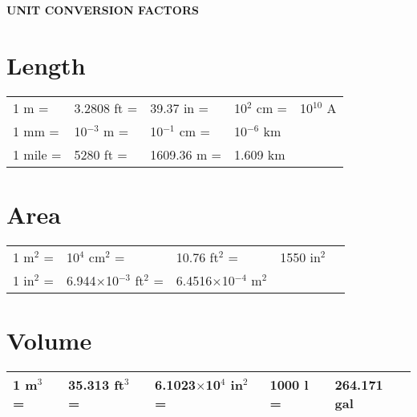 \documentclass[11pts,a4paper,amsmath,amssymb,floatfix]{article}
\begin{document}
\begin{center}
 {\bf UNIT CONVERSION FACTORS}
\end{center}

\section{Length}\label{Chapter:UnitConversion:Section:Length}
     \begin{center}
     \begin{tabular}{|l l l l l|}
       \hline
       1 m =& 3.2808 ft =& 39.37 in =& 10$^{2}$ cm =& 10$^{10}$ A \\
       1 mm =& 10$^{-3}$ m =& 10$^{-1}$ cm =& 10$^{-6}$ km &       \\
       1 mile =& 5280 ft =& 1609.36 m =& 1.609 km &             \\
       \hline           
     \end{tabular}
     \end{center}
          
\section{Area}\label{Chapter:UnitConversion:Section:Area}
     \begin{center}
     \begin{tabular}{|l l l l l|}
       \hline
       1 m$^{2}$ =& 10$^{4}$ cm$^{2}$ =& 10.76 ft$^{2}$ =& 1550 in$^{2}$ & \\
       1 in$^{2}$ =& 6.944$\times$10$^{-3}$ ft$^{2}$ =& 6.4516$\times$10$^{-4}$ m$^{2}$ & & \\
       \hline           
     \end{tabular}
     \end{center}
          
\section{Volume}\label{Chapter:UnitConversion:Section:Volume}
     \begin{center}
     \begin{tabular}{|l l l l l|}
       \hline    
       1 m$^{3}$ =& 35.313 ft$^{3}$ =& 6.1023$\times$10$^{4}$ in$^{2}$ =& 1000 l =& 264.171 gal \\
       \hline            
     \end{tabular}
     \end{center}
          
\end{document}
